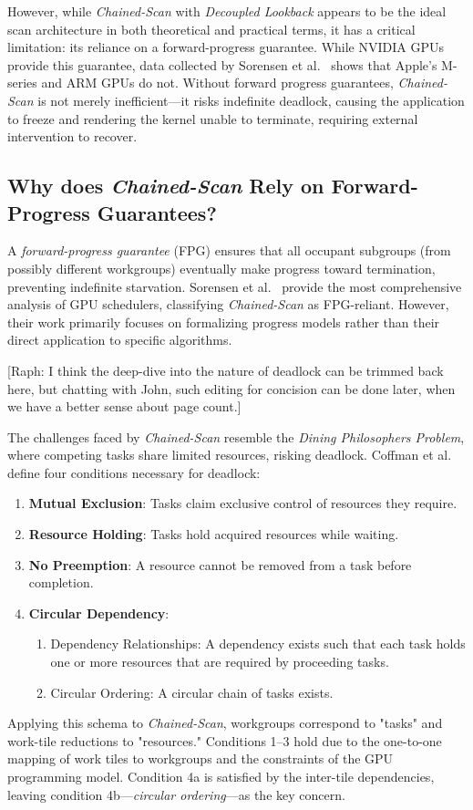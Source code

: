 \documentclass[sigconf]{acmart}
\newcommand{\raph}[1]{{\footnotesize\color{magenta}[Raph: #1]}}
\begin{document}
However, while \emph{Chained-Scan} with \emph{Decoupled Lookback} appears to be the ideal scan architecture in both theoretical and practical terms, it has a critical limitation: its reliance on a forward-progress guarantee. While NVIDIA GPUs provide this guarantee, data collected by Sorensen et al.~\cite{sorensen2021} shows that Apple’s M-series and ARM GPUs do not. Without forward progress guarantees, \emph{Chained-Scan} is not merely inefficient---it risks indefinite deadlock, causing the application to freeze and rendering the kernel unable to terminate, requiring external intervention to recover.

\subsection{Why does \emph{Chained-Scan} Rely on Forward-Progress Guarantees?}
A \emph{forward-progress guarantee} (FPG) ensures that all occupant subgroups (from possibly different workgroups) eventually make progress toward termination, preventing indefinite starvation. Sorensen et al.~\cite{sorensen2018,sorensen2021} provide the most comprehensive analysis of GPU schedulers, classifying \emph{Chained-Scan} as FPG-reliant. However, their work primarily focuses on formalizing progress models rather than their direct application to specific algorithms.

\raph{I think the deep-dive into the nature of deadlock can be trimmed back here, but chatting with John, such editing for concision can be done later, when we have a better sense about page count.}

The challenges faced by \emph{Chained-Scan} resemble the \emph{Dining Philosophers Problem}, where competing tasks share limited resources, risking deadlock. Coffman et al.~\cite{10.1145/356586.356588} define four conditions necessary for deadlock:
\begin{enumerate}
  \item \textbf{Mutual Exclusion}: Tasks claim exclusive control of resources they require.
  \item \textbf{Resource Holding}: Tasks hold acquired resources while waiting.
  \item \textbf{No Preemption}: A resource cannot be removed from a task before completion.
  \item \textbf{Circular Dependency}:
        \begin{enumerate}
          \item Dependency Relationships: A dependency exists such that each task holds one or more resources that are required by proceeding tasks.
          \item Circular Ordering: A circular chain of tasks exists.
        \end{enumerate}
\end{enumerate}
Applying this schema to \emph{Chained-Scan}, workgroups correspond to "tasks" and work-tile reductions to "resources." Conditions 1–3 hold due to the one-to-one mapping of work tiles to workgroups and the constraints of the GPU programming model. Condition 4a is satisfied by the inter-tile dependencies, leaving condition 4b---\emph{circular ordering}---as the key concern.
\end{document}
